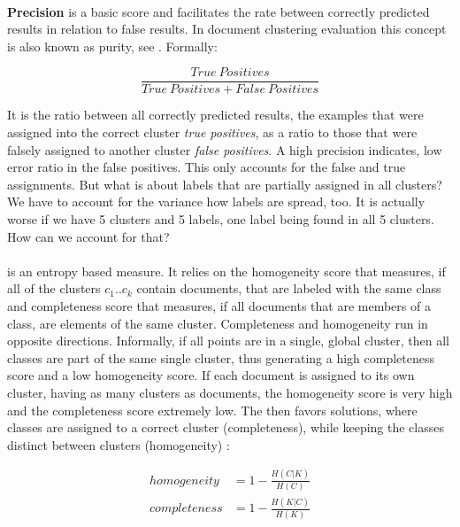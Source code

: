     \paragraph{} \textbf{Precision} is a basic score and facilitates the rate between correctly predicted results in relation to false results. In document clustering evaluation this concept is also known as purity, see \cite[chp. 16]{IRBook2008}. Formally:

      \begin{equation}
        \frac{True\:Positives}{True\:Positives + False\:Positives}
      \end{equation}

    It is the ratio between all correctly predicted results, the examples that were assigned into the correct cluster \emph{true positives}, as a ratio to those that were falsely assigned to another cluster \emph{false positives}. A high precision indicates, low error ratio in the false positives. This only accounts for the false and true assignments. But what is about labels that are partially assigned in all clusters? We have to account for the variance how labels are spread, too. It is actually worse if we have 5 clusters and 5 labels, one label being found in all 5 clusters. How can we account for that?

    \paragraph{\vmeasure} is an entropy based measure. It relies on the homogeneity score that measures, if all of the clusters $c_1..c_k$ contain documents, that are labeled with the same class and completeness score that measures, if all documents that are members of a class, are elements of the same cluster. Completeness and homogeneity run in opposite directions. Informally, if all points are in a single, global cluster, then all classes are part of the same single cluster, thus generating a high completeness score and a low homogeneity score. If each document is assigned to its own cluster, having as many clusters as documents, the homogeneity score is very high and the completeness score extremely low. The \vmeasure{} then favors solutions, where classes are assigned to a correct cluster (completeness), while keeping the classes distinct between clusters (homogeneity) \cite{VMeasure2007}:
      
      \begin{equation}
      \begin{split}
        homogeneity   &= 1 - \frac{H(C|K)}{H(C)}\\
        completeness  &= 1 - \frac{H(K|C)}{H(K)}
      \end{split}
      \end{equation}


